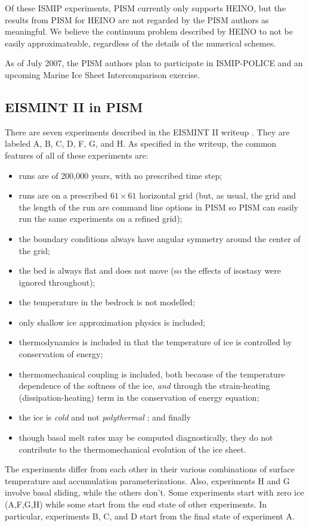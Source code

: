 \documentclass[11pt,final]{amsart}
\begin{document}
Of these ISMIP experiments, PISM currently only supports HEINO, but the results from PISM for HEINO are not regarded by the PISM authors as meaningful.  We believe the continuum problem described by HEINO to not be easily approximateable, regardless of the details of the numerical schemes.

As of July 2007, the PISM authors plan to participate in ISMIP-POLICE and an upcoming Marine Ice Sheet Intercomparison exercise.

\subsection{EISMINT II in PISM}  There are seven experiments described in the EISMINT II writeup \cite{EISMINT00}. They are labeled A, B, C, D, F, G, and H.  As specified in the writeup, the common features of all of these experiments are:\begin{itemize}
\item runs are of 200,000 years, with no prescribed time step;
\item runs are on a prescribed $61\times 61$ horizontal grid (but, as usual, the grid and the length of the run are command line options in PISM so PISM can easily run the same experiments on a refined grid);
\item the boundary conditions always have angular symmetry around the center of the grid;
\item the bed is always flat and does not move (so the effects of isostasy were ignored throughout);
\item the temperature in the bedrock is not modelled;
\item only shallow ice approximation physics is included;
\item thermodynamics is included in that the temperature of ice is controlled by conservation of energy;
\item thermomechanical coupling is included, both because of the temperature dependence of the softness of the ice, \emph{and} through the strain-heating (dissipation-heating) term in the conservation of energy equation;
\item the ice is \emph{cold} and not \emph{polythermal} \cite{Greve}; and finally
\item though basal melt rates may be computed diagnostically, they do not contribute to the thermomechanical evolution of the ice sheet.
\end{itemize}
The experiments differ from each other in their various combinations of surface temperature and accumulation parameterizations.  Also, experiments H and G involve basal sliding, while the others don't.  Some experiments start with zero ice (A,F,G,H) while some start from the end state of other experiments.  In particular, experiments B, C, and D start from the final state of experiment A.
\end{document}
